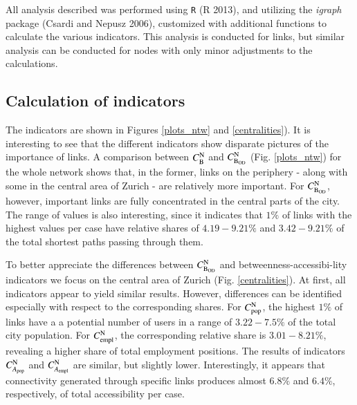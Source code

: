 \documentclass[]{elsarticle} %
\begin{document}
All analysis described was performed using \texttt{R} (R 2013), and
utilizing the \textit{igraph} package (Csardi and Nepusz 2006),
customized with additional functions to calculate the various
indicators. This analysis is conducted for links, but similar analysis
can be conducted for nodes with only minor adjustments to the
calculations.

\subsection{Calculation of indicators}\label{calculation-of-indicators}

The indicators are shown in Figures \ref{plots_ntw} and
\ref{centralities}). It is interesting to see that the different
indicators show disparate pictures of the importance of links. A
comparison between \(C_{\rm B}^{\rm N}\) and \(C_{\rm B_{OD}}^{\rm N}\)
(Fig. \ref{plots_ntw}) for the whole network shows that, in the former,
links on the periphery - along with some in the central area of Zurich -
are relatively more important. For \(C_{\rm B_{OD}}^{\rm N}\), however,
important links are fully concentrated in the central parts of the city.
The range of values is also interesting, since it indicates that \(1\%\)
of links with the highest values per case have relative shares of
\(4.19-9.21\%\) and \(3.42-9.21\%\) of the total shortest paths passing
through them.

To better appreciate the differences between \(C_{\rm B_{OD}}^{\rm N}\)
and betweenness-accessibi-lity indicators we focus on the central area
of Zurich (Fig. \ref{centralities}). At first, all indicators appear to
yield similar results. However, differences can be identified especially
with respect to the corresponding shares. For \(C_{\rm pop}^{\rm N}\),
the highest \(1\%\) of links have a a potential number of users in a
range of \(3.22-7.5\%\) of the total city population. For
\(C_{\rm empl}^{\rm N}\), the corresponding relative share is
\(3.01-8.21\%\), revealing a higher share of total employment positions.
The results of indicators \(C_{A_{\rm pop}}^{\rm N}\) and
\(C_{A_{\rm empl}}^{\rm N}\) are similar, but slightly lower.
Interestingly, it appears that connectivity generated through specific
links produces almost \(6.8\%\) and \(6.4\%\), respectively, of total
accessibility per case.
\end{document}
